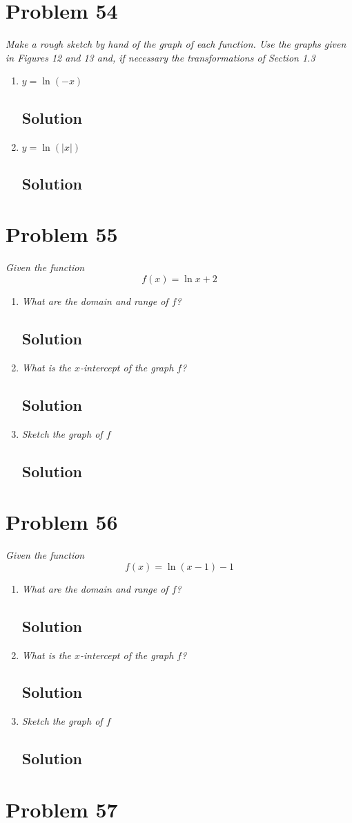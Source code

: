 \documentclass[11pt]{article}
\newcommand{\soln}{\subsection*}
\newcommand{\qn}{\textit}
\begin{document}
\section*{Problem 54}

\qn{Make a rough sketch by hand of the graph of each function. Use the graphs given in Figures 12 and 13 and, if necessary the transformations of Section 1.3}
\begin{enumerate}
	\item \qn{$y=\ln(-x)$}
	\soln{Solution}
	
	\item \qn{$y=\ln(|x|)$}
	\soln{Solution}
\end{enumerate}

\section*{Problem 55}

\qn{Given the function $$f(x)=\ln{x}+2$$}
\begin{enumerate}
	\item \qn{What are the domain and range of $f$?}
	\soln{Solution}
	
	\item \qn{What is the $x$-intercept of the graph $f$?}
	\soln{Solution}
	
	\item \qn{Sketch the graph of $f$}
	\soln{Solution}
\end{enumerate}

\section*{Problem 56}

\qn{Given the function $$f(x)=\ln(x-1)-1$$}
\begin{enumerate}
	\item \qn{What are the domain and range of $f$?}
	\soln{Solution}
	
	\item \qn{What is the $x$-intercept of the graph $f$?}
	\soln{Solution}
	
	\item \qn{Sketch the graph of $f$}
	\soln{Solution}
\end{enumerate}

\section*{Problem 57}
\end{document}
